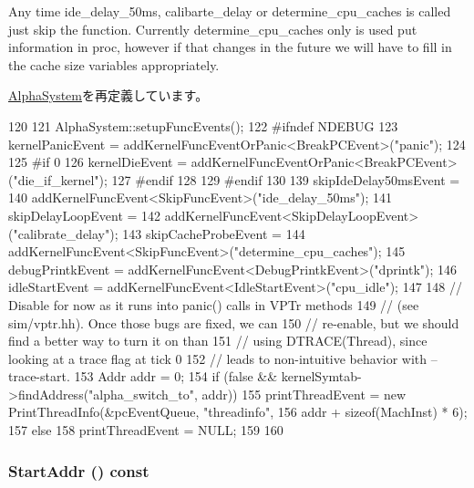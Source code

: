 Any time ide\_\-delay\_\-50ms, calibarte\_\-delay or determine\_\-cpu\_\-caches is called just skip the function. Currently determine\_\-cpu\_\-caches only is used put information in proc, however if that changes in the future we will have to fill in the cache size variables appropriately.

\hyperlink{classAlphaSystem_ae36115f702dd2f9ead5df8d632632cf7}{AlphaSystem}を再定義しています。


\begin{DoxyCode}
120 {
121     AlphaSystem::setupFuncEvents();
122 #ifndef NDEBUG
123     kernelPanicEvent = addKernelFuncEventOrPanic<BreakPCEvent>("panic");
124 
125 #if 0
126     kernelDieEvent = addKernelFuncEventOrPanic<BreakPCEvent>("die_if_kernel");
127 #endif
128 
129 #endif
130 
139     skipIdeDelay50msEvent =
140         addKernelFuncEvent<SkipFuncEvent>("ide_delay_50ms");
141     skipDelayLoopEvent =
142         addKernelFuncEvent<SkipDelayLoopEvent>("calibrate_delay");
143     skipCacheProbeEvent =
144         addKernelFuncEvent<SkipFuncEvent>("determine_cpu_caches");
145     debugPrintkEvent = addKernelFuncEvent<DebugPrintkEvent>("dprintk");
146     idleStartEvent = addKernelFuncEvent<IdleStartEvent>("cpu_idle");
147 
148     // Disable for now as it runs into panic() calls in VPTr methods
149     // (see sim/vptr.hh).  Once those bugs are fixed, we can
150     // re-enable, but we should find a better way to turn it on than
151     // using DTRACE(Thread), since looking at a trace flag at tick 0
152     // leads to non-intuitive behavior with --trace-start.
153     Addr addr = 0;
154     if (false && kernelSymtab->findAddress("alpha_switch_to", addr)) {
155         printThreadEvent = new PrintThreadInfo(&pcEventQueue, "threadinfo",
156                                                addr + sizeof(MachInst) * 6);
157     } else {
158         printThreadEvent = NULL;
159     }
160 }
\end{DoxyCode}
\hypertarget{classLinuxAlphaSystem_a0cec91dcd0a14397dacd2e083f248ac8}{
\subsubsection[{StartAddr}]{ StartAddr () const}}
\label{classLinuxAlphaSystem_a0cec91dcd0a14397dacd2e083f248ac8}



